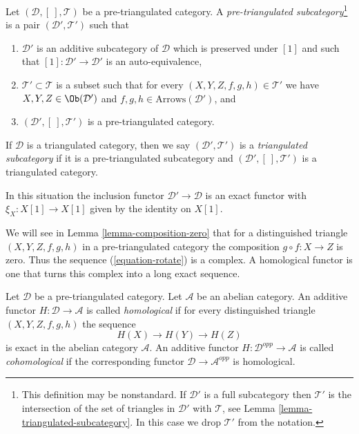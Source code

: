 \begin{definition}
\label{definition-triangulated-subcategory}
Let $(\mathcal{D}, [\ ], \mathcal{T})$ be a pre-triangulated category.
A {\it pre-triangulated subcategory}\footnote{This definition may be
nonstandard. If $\mathcal{D}'$ is a full subcategory then $\mathcal{T}'$
is the intersection of the set of triangles in $\mathcal{D}'$ with
$\mathcal{T}$, see
Lemma \ref{lemma-triangulated-subcategory}.
In this case we drop $\mathcal{T}'$ from the notation.}
is a pair $(\mathcal{D}', \mathcal{T}')$ such that
\begin{enumerate}
\item $\mathcal{D}'$ is an additive subcategory of $\mathcal{D}$
which is preserved under $[1]$ and such that
$[1] : \mathcal{D}' \to \mathcal{D}'$ is an auto-equivalence,
\item $\mathcal{T}' \subset \mathcal{T}$ is a subset such that for every
$(X, Y, Z, f, g, h) \in \mathcal{T}'$ we have
$X, Y, Z \in \Ob(\mathcal{D}')$ and
$f, g, h \in \text{Arrows}(\mathcal{D}')$, and
\item $(\mathcal{D}', [\ ], \mathcal{T}')$ is a pre-triangulated
category.
\end{enumerate}
If $\mathcal{D}$ is a triangulated category, then we say
$(\mathcal{D}', \mathcal{T}')$ is a {\it triangulated subcategory} if
it is a pre-triangulated subcategory and
$(\mathcal{D}', [\ ], \mathcal{T}')$ is a triangulated category.
\end{definition}

\noindent
In this situation the inclusion functor
$\mathcal{D}' \to \mathcal{D}$ is an exact functor
with $\xi_X : X[1] \to X[1]$ given by the identity on $X[1]$.

\medskip\noindent
We will see in
Lemma \ref{lemma-composition-zero}
that for a distinguished triangle $(X, Y, Z, f, g, h)$
in a pre-triangulated category the composition $g \circ f : X \to Z$ is zero.
Thus the sequence (\ref{equation-rotate}) is a complex.
A homological functor is one that turns this complex into a long
exact sequence.

\begin{definition}
\label{definition-homological}
Let $\mathcal{D}$ be a pre-triangulated category.
Let $\mathcal{A}$ be an abelian category.
An additive functor $H : \mathcal{D} \to \mathcal{A}$ is called
{\it homological} if for every distinguished triangle
$(X, Y, Z, f, g, h)$ the sequence
$$
H(X) \to H(Y) \to H(Z)
$$
is exact in the abelian category $\mathcal{A}$. An additive functor
$H : \mathcal{D}^{opp} \to \mathcal{A}$ is called {\it cohomological}
if the corresponding functor $\mathcal{D} \to \mathcal{A}^{opp}$ is
homological.
\end{definition}


